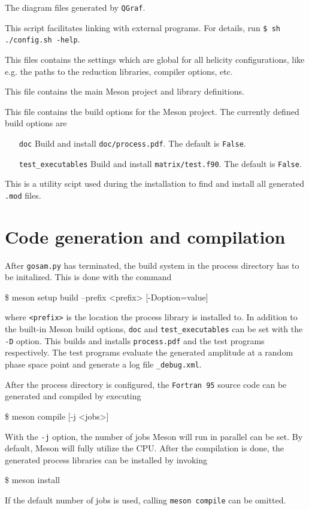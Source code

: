 \documentclass[11pt,a4paper]{refrep}
\newcommand{\qgraf}{{\tt QGraf}\xspace}
\newcommand{\fortranXC}{{\tt Fortran\,95}\xspace}
\begin{document}
 The diagram files generated
by \qgraf.

 This script facilitates linking with external
programs. For details, run
{\tt \$ sh ./config.sh -help}.

 This files contains the settings
which are global for all helicity configurations, 
like e.g. the paths to the reduction libraries, compiler options, etc.

 This file contains the main Meson project and library definitions.

 This file contains the build options for the Meson project. The currently
defined build options are 
\begin{itemize}
   \item[{\tt doc}] Build and install {\tt doc/process.pdf}. The default is {\tt False}.
   \item[{\tt test\_executables}] Build and install {\tt matrix/test.f90}. The default is {\tt False}. 
\end{itemize}

 This is a utility scipt used during the installation to find and
install all generated {\tt {.}mod} files.

\section{Code generation and compilation}
After {\tt gosam{.}py} has terminated, the build system in the process directory has to be initalized. 
This is done with the command 
\begin{example}
\$ meson setup build --prefix <prefix> [-Doption=value]
\end{example}
where {\tt <prefix>} is the location the process library is installed to. In addition to the built-in Meson
build options, {\tt doc} and {\tt test\_executables} can be set with the {\tt -D} option. This builds and 
installs {\tt process{.}pdf} and the test programs respectively. The test programs evaluate the generated
amplitude at a random phase space point and generate a log file {\tt \_debug.xml}.

After the process directory is configured, the \fortranXC source code can be generated and compiled by 
executing
\begin{example}
\$ meson compile [-j <jobs>]
\end{example}
With the {\tt -j} option, the number of jobs Meson will run in parallel can be set. By default, Meson will
fully utilize the CPU. After the compilation is done, the generated process libraries can be installed by
invoking 
\begin{example}
\$ meson install
\end{example}
If the default number of jobs is used, calling {\tt meson compile} can be omitted.
\end{document}
